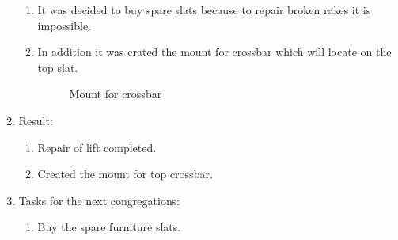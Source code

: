 \begin{enumerate}
\begin{enumerate}
      \item It was decided to buy spare slats because to repair broken rakes it is impossible.
      
      \item In addition it was crated the mount for crossbar which will locate on the top slat.
      
      \begin{figure}[H]
      	\begin{minipage}[h]{1\linewidth}
      		\caption{Mount for crossbar}
      	\end{minipage}
      \end{figure}
      
    \end{enumerate}
    
	\item Result: 
	\begin{enumerate}
	  \item Repair of lift completed.
	  
      \item Created the mount for top crossbar.
      
    \end{enumerate}
    
	\item Tasks for the next congregations:
	\begin{enumerate}
	  \item Buy the spare furniture slats.
	  
    \end{enumerate}     
\end{enumerate}
\fillpage
